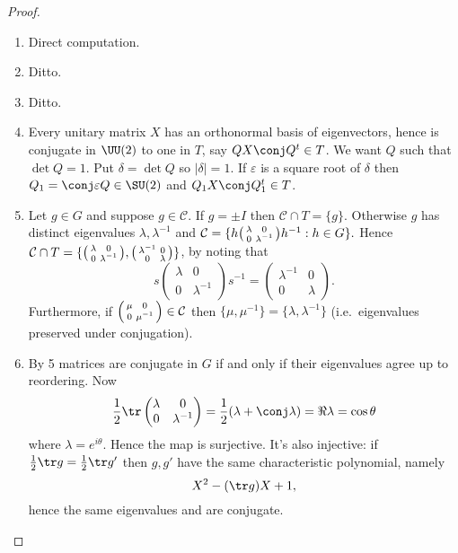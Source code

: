 \documentclass[a4paper]{article}
\newcommand{\ccl}{{\mathcal C}} %
\theoremstyle{definition}
\begin{document}
\begin{proof}\leavevmode
  \begin{enumerate}
  \item Direct computation.
  \item Ditto.
  \item Ditto.
  \item Every unitary matrix \(X\) has an orthonormal basis of eigenvectors, hence is conjugate in \(\UU(2)\) to one in \(T\), say \(QX \conj Q^t \in T\). We want \(Q\) such that \(\det Q = 1\). Put \(\delta = \det Q\) so \(|\delta| = 1\). If \(\varepsilon\) is a square root of \(\delta\) then \(Q_1 = \conj \varepsilon Q \in \SU(2)\) and \(Q_1X \conj Q_1^t \in T\).
  \item Let \(g \in G\) and suppose \(g \in \ccl\). If \(g = \pm I\) then \(\ccl \cap T = \{g\}\). Otherwise \(g\) has distinct eigenvalues \(\lambda, \lambda^{-1}\) and \(\ccl = \{
    h
    \begin{psmallmatrix}
      \lambda & 0 \\
      0 & \lambda^{-1}
    \end{psmallmatrix}
    h^{-1}: h \in G\}.
    \)
    Hence \(\ccl \cap T = \{
    \begin{psmallmatrix}
      \lambda & 0 \\
      0 & \lambda^{-1}
    \end{psmallmatrix}
    ,
    \begin{psmallmatrix}
      \lambda^{-1} & 0 \\
      0 & \lambda
    \end{psmallmatrix}
    \}\), by noting that
    \[
      s
      \begin{pmatrix}
        \lambda & 0 \\
        0 & \lambda^{-1}
      \end{pmatrix}
      s^{-1}
      =
      \begin{pmatrix}
        \lambda^{-1} & 0 \\
        0 & \lambda
      \end{pmatrix}.
    \]
    Furthermore, if \(
    \begin{psmallmatrix}
      \mu & 0 \\
      0 & \mu^{-1}
    \end{psmallmatrix}
    \in \ccl \) then \(\{\mu, \mu^{-1}\} = \{\lambda, \lambda^{-1}\}\) (i.e.\ eigenvalues preserved under conjugation).
  \item By 5 matrices are conjugate in \(G\) if and only if their eigenvalues agree up to reordering. Now
    \[
      \frac{1}{2} \tr
      \begin{pmatrix}
        \lambda & 0 \\
        0 & \lambda^{-1}
      \end{pmatrix}
      = \frac{1}{2}(\lambda + \conj \lambda)
      = \Re \lambda
      = \cos \theta
    \]
    where \(\lambda = e^{i\theta}\). Hence the map is surjective. It's also injective: if \(\frac{1}{2} \tr g = \frac{1}{2} \tr g'\) then \(g, g'\) have the same characteristic polynomial, namely
    \[
      X^2 - (\tr g) X + 1,
    \]
    hence the same eigenvalues and are conjugate.
  \end{enumerate}
\end{proof}
\end{document}
